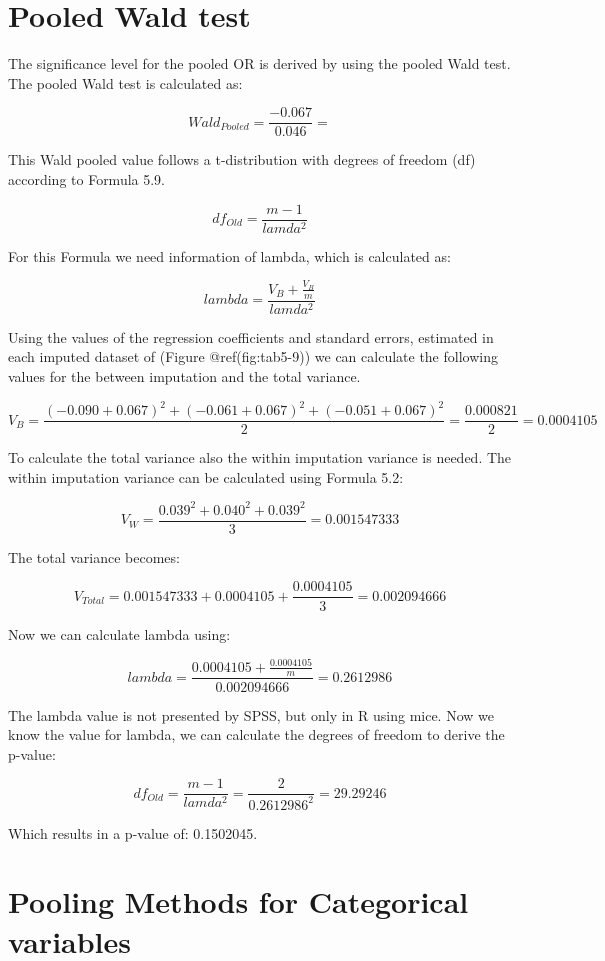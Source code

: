 \documentclass[
]{book}
\begin{document}
\hypertarget{pooled-wald-test}{%
\chapter{Pooled Wald test}\label{pooled-wald-test}}

The significance level for the pooled OR is derived by using the pooled
Wald test. The pooled Wald test is calculated as:

\[Wald_{Pooled} =\frac{-0.067}{0.046}=\]

This Wald pooled value follows a t-distribution with degrees of freedom
(df) according to Formula 5.9.

\[df_{Old} = \frac{m-1}{lamda^2}\]

For this Formula we need information of lambda, which is calculated as:

\[lambda = \frac{V_B + \frac{V_B}{m}}{lamda^2}\]

Using the values of the regression coefficients and standard errors,
estimated in each imputed dataset of (Figure @ref(fig:tab5-9)) we can
calculate the following values for the between imputation and the total
variance.

\[V_B= \frac{(-0.090+0.067)^2 + (-0.061+0.067)^2 +(-0.051+0.067)^2}{2}=\frac{0.000821}{2}=0.0004105\]

To calculate the total variance also the within imputation variance is
needed. The within imputation variance can be calculated using Formula
5.2:

\[V_W= \frac{0.039^2 + 0.040^2 + 0.039^2}{3}=0.001547333\]

The total variance becomes:

\[V_{Total} = 0.001547333+0.0004105+ \frac{0.0004105}{3}=0.002094666\]

Now we can calculate lambda using:

\[lambda = \frac{0.0004105 + \frac{0.0004105}{m}}{0.002094666}=0.2612986\]

The lambda value is not presented by SPSS, but only in R using mice. Now
we know the value for lambda, we can calculate the degrees of freedom to
derive the p-value:

\[df_{Old} = \frac{m-1}{lamda^2}=\frac{2}{0.2612986^2}=29.29246\]

Which results in a p-value of: 0.1502045.

\hypertarget{pooling-methods-for-categorical-variables}{%
\chapter{Pooling Methods for Categorical
variables}\label{pooling-methods-for-categorical-variables}}
\end{document}
